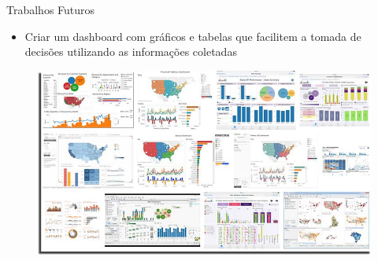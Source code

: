 \begin{frame}{Trabalhos Futuros}
\begin{itemize}
    \item Criar um dashboard com gráficos e tabelas que facilitem a tomada de decisões utilizando as informações coletadas
\end{itemize}
\begin{figure}[htbp]
    \label{fig:tableau}
    \centering
    \includegraphics[height=0.7\textheight,width=\textwidth,keepaspectratio]{imagens/tableau.jpg}
\end{figure}
\end{frame}